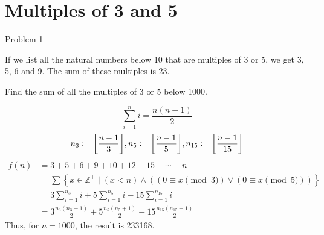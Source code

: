 \documentclass{article}
\DeclarePairedDelimiter\floor{\lfloor}{\rfloor}
\newcommand{\ssep}{\mid}
\begin{document}
  \section{Multiples of 3 and 5}
  Problem 1
  
  If we list all the natural numbers below 10 that are multiples of 3 or 5, we get 3, 5, 6 and 9. The sum of these multiples is 23.

  Find the sum of all the multiples of 3 or 5 below 1000.

  \begin{equation*}
    \sum\limits_{i=1}^{n} i = \frac{n(n+1)}{2}
  \end{equation*}
  \begin{equation*}
    n_3 := \floor*{\frac{n-1}{3}},
    n_5 := \floor*{\frac{n-1}{5}},
    n_{15} := \floor*{\frac{n-1}{15}}
  \end{equation*}
  \begin{equation*}
    \begin{split}
      f(n)
      &= 3 + 5 + 6 + 9 + 10 + 12 + 15 + \cdots + n \\
      &= \sum\left\{ x \in \mathbb{Z}^+
        \ssep \left(x < n\right)
        \land \left(
          \left(0 \equiv x \pmod 3\right)
          \lor \left(0 \equiv x \pmod 5\right)
        \right)
      \right\} \\
      &= 3\sum\limits_{i=1}^{n_3} i
        + 5\sum\limits_{i=1}^{n_5} i
        - 15\sum\limits_{i=1}^{n_{15}} i \\
      &= 3\frac{n_3(n_3 + 1)}{2}
        + 5\frac{n_5(n_5 + 1)}{2}
        - 15\frac{n_{15}(n_{15} + 1)}{2}
    \end{split}
  \end{equation*}
  Thus, for $n=1000$, the result is 233168.
\end{document}
